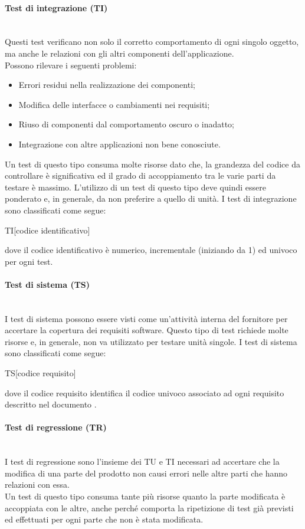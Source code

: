 		\paragraph{Test di integrazione (TI)}
		~\\Questi test verificano non solo il corretto comportamento di ogni singolo oggetto, 
		ma anche le relazioni con gli altri componenti dell'applicazione.
		~\\Possono rilevare i seguenti problemi:
		\begin{itemize}
			\item Errori residui nella realizzazione dei componenti;
			\item Modifica delle interfacce o cambiamenti nei requisiti;
			\item Riuso di componenti dal comportamento oscuro o inadatto;
			\item Integrazione con altre applicazioni non bene conosciute.
		\end{itemize}
		Un test di questo tipo consuma molte risorse dato che, la grandezza del codice da controllare è 
		significativa ed il grado di accoppiamento tra le varie parti da testare è massimo. 
		L'utilizzo di un test di questo tipo deve quindi essere ponderato e, in generale, da non preferire a quello di unità.
		I test di integrazione sono classificati come segue:
		\begin{center} TI[codice identificativo]\end{center}
		dove il codice identificativo è numerico, incrementale (iniziando da 1) ed univoco per ogni test.
		
		
		\paragraph{Test di sistema (TS)}
		~\\I test di sistema possono essere visti come un'attività interna del fornitore
		per accertare la copertura dei requisiti software.
		\newline{}Questo tipo di test richiede molte risorse e, in generale, non va utilizzato per testare
		unità singole. I test di sistema sono classificati come segue:
		\begin{center} TS[codice requisito]\end{center}
		dove il codice requisito identifica	il codice univoco associato ad ogni requisito descritto nel documento \AdR.
		
		\paragraph{Test di regressione (TR)}
		~\\I test di regressione sono l'insieme dei TU e TI necessari ad accertare che la modifica
		di una parte del prodotto non causi errori nelle altre parti che hanno relazioni con essa.
		\\Un test di questo tipo consuma tante più risorse quanto la parte modificata è accoppiata con le altre, 
		anche perché comporta la ripetizione di test già previsti ed effettuati per ogni parte che non è 
		stata modificata.
		
